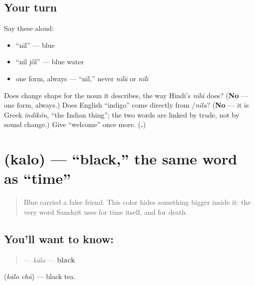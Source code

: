 \subsection*{Your turn}
Say these aloud:

\begin{itemize}
\raggedright
  \item \textquotedblleft{}nīl\textquotedblright{} — blue
  \item \textquotedblleft{}nīl jôl\textquotedblright{} — blue water
  \item one form, always — \textquotedblleft{}nīl,\textquotedblright{} never \emph{nīlā} or \emph{nīlī}
\end{itemize}

\begin{tcolorbox}[breakable,colback=teal!4,colframe=teal!35!black,title={Before you move on}]
Does  change shape for the noun it describes, the way Hindi's \emph{nīlā} does? (\textbf{No} — one form, always.) Does English \textquotedblleft{}indigo\textquotedblright{} come directly from /\emph{nīla}? (\textbf{No} — it is Greek \emph{indikón}, \textquotedblleft{}the Indian thing\textquotedblright{}; the two words are linked by trade, not by sound change.) Give \textquotedblleft{}welcome\textquotedblright{} once more. (\textbf{.})
\end{tcolorbox}
\section[kalo]{ (kalo) — \textquotedblleft{}black,\textquotedblright{} the same word as \textquotedblleft{}time\textquotedblright{}}

\label{lesson:BN-C14-kalo}



\begin{quote}
Blue carried a false friend. This color hides something bigger inside it: the very word Sanskrit uses for time itself, and for death.
\end{quote}

\subsection*{You'll want to know: }
\begin{quote}
\textbf{} — \emph{kālo} — \textbf{black}
\end{quote}

  (\emph{kālo chā}) — black tea.


